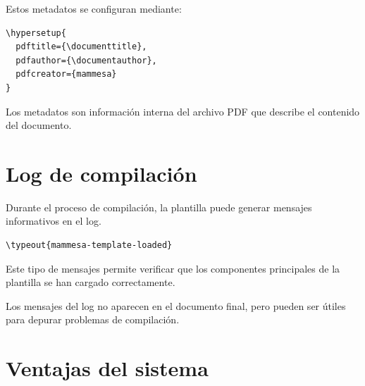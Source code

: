 Estos metadatos se configuran mediante:

\begin{lstlisting}[caption={Metadatos del PDF},label={code:metadata}]
\hypersetup{
  pdftitle={\documenttitle},
  pdfauthor={\documentauthor},
  pdfcreator={mammesa}
}
\end{lstlisting}




\begin{definitionbox}[Metadatos]
Los metadatos son información interna del archivo
PDF que describe el contenido del documento.
\end{definitionbox}




\section{Log de compilación}

Durante el proceso de compilación, la plantilla
puede generar mensajes informativos en el log.

\begin{lstlisting}[caption={Mensaje de compilación},label={code:logmessage}]
\typeout{mammesa-template-loaded}
\end{lstlisting}




Este tipo de mensajes permite verificar que los
componentes principales de la plantilla se han
cargado correctamente.



\begin{warningbox}
Los mensajes del log no aparecen en el documento
final, pero pueden ser útiles para depurar
problemas de compilación.
\end{warningbox}




\section{Ventajas del sistema}

